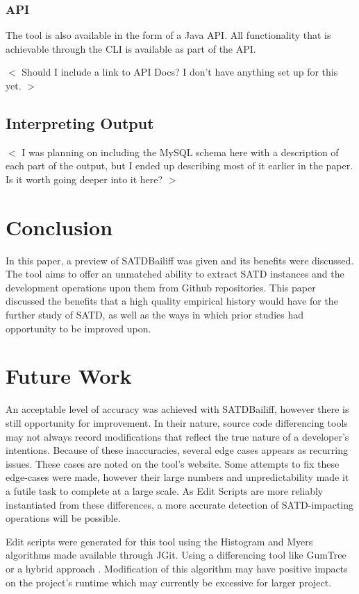 \documentclass[conference]{IEEEtran}
\begin{document}
\subsubsection{API}

The tool is also available in the form of a Java API. All functionality that is achievable through the CLI is available as part of the API.

$<$ Should I include a link to API Docs? I don't have anything set up for this yet. $>$

\subsection{Interpreting Output}
$<$ I was planning on including the MySQL schema here with a description of each part of the output, but I ended up describing most of it earlier in the paper. Is it worth going deeper into it here? $>$

\section{Conclusion}

In this paper, a preview of SATDBailiff was given and its benefits were discussed. The tool aims to offer an unmatched ability to extract SATD instances and the development operations upon them from Github repositories.
This paper discussed the benefits that a high quality empirical history would have for the further study of SATD, as well as the ways in which prior studies had opportunity to be improved upon.

\section{Future Work}

An acceptable level of accuracy was achieved with SATDBailiff, however there is still opportunity for improvement. In their nature, source code differencing tools may not always record modifications that reflect the true nature of a developer's intentions. Because of these inaccuracies, several edge cases appears as recurring issues. These cases are noted on the tool's website. Some attempts to fix these edge-cases were made, however their large numbers and unpredictability made it a futile task to complete at a large scale. As Edit Scripts are more reliably instantiated from these differences, a more accurate detection of SATD-impacting operations will be possible.

Edit scripts were generated for this tool using the Histogram and Myers algorithms made available through JGit. Using a differencing tool like GumTree \cite{Falleri} or a hybrid approach \cite{Matsumoto}. Modification of this algorithm may have positive impacts on the project's runtime which may currently be excessive for larger project.





\end{document}
